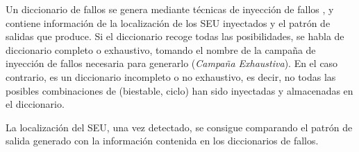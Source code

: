 Un diccionario de fallos se genera mediante técnicas de inyección de fallos
\cite{}, y
contiene información de la localización de los \gls{SEU} inyectados y el patrón de
salidas que produce. Si el diccionario recoge todas las posibilidades, se habla de
diccionario completo o exhaustivo, tomando el nombre de la campaña de inyección 
de fallos necesaria para generarlo (\textit{Campaña Exhaustiva}). En el caso 
contrario, es un diccionario incompleto o no exhaustivo, es decir, no todas las
posibles combinaciones de (biestable, ciclo) han sido inyectadas y almacenadas en
el diccionario. 

La localización del \gls{SEU}, una vez detectado, se consigue comparando el patrón
de salida generado con la información contenida en los diccionarios de fallos.


\cite{SEUDiagnosis}




\endinput
